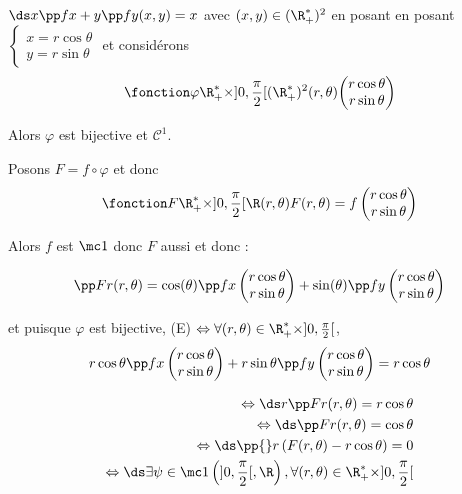 \begin{exemple}
    $\ds x \pp f x + y \pp f y (x, y) = x$ avec $(x, y) \in (\R^*_+)^2$ en posant 
    en posant $\begin{cases}
        x = r \cos \theta \\
        y = r \sin \theta
    \end{cases}$ et considérons 
    $$\fonction \varphi {\R^*_+ \times ]0, \frac \pi 2 [}{(\R_+^*)^2}{(r, \theta)}{\begin{pmatrix}
        r \cos \theta \\
        r \sin \theta
    \end{pmatrix}}$$
    
    Alors $\varphi$ est bijective et $\mathscr C^1$. 

    Posons $F = f \circ \varphi$ et donc $$\fonction F {\R^*_+ \times ]0, \frac \pi 2 [}{\R}{(r, \theta)}{F(r, \theta) = f\begin{pmatrix}
        r \cos \theta \\
        r \sin \theta
    \end{pmatrix}}$$

    Alors $f$ est $\mc 1$ donc $F$ aussi et donc : 

    $$\pp F r (r, \theta) = \cos( \theta) \pp f x \begin{pmatrix}
        r \cos \theta \\
        r \sin \theta
    \end{pmatrix} + \sin(\theta) \pp f y \begin{pmatrix}
        r \cos \theta \\
        r \sin \theta
    \end{pmatrix}$$ 

    et puisque $\varphi$ est bijective, (E) $\Leftrightarrow \forall (r, \theta) \in \R^*_+ \times ]0, \frac \pi 2 [$,
    $$r \cos \theta \pp f x \begin{pmatrix}
        r \cos \theta \\
        r \sin \theta
    \end{pmatrix} + r \sin \theta \pp f y \begin{pmatrix}
        r \cos \theta \\
        r \sin \theta
    \end{pmatrix} = r \cos \theta$$

    \begin{align}
        \Leftrightarrow \ds r \pp F r (r, \theta) = r \cos \theta \\
        \Leftrightarrow \ds \pp F r (r, \theta) = \cos \theta \\
        \Leftrightarrow \ds \pp {} r \left( F(r, \theta) - r \cos \theta \right) = 0 \\
        \Leftrightarrow \ds \exists \psi \in \mc 1 \left( ]0, \frac \pi 2 [, \R \right), \forall (r, \theta) \in \R^*_+ \times ]0, \frac \pi 2 [
    \end{align}


\end{exemple}
